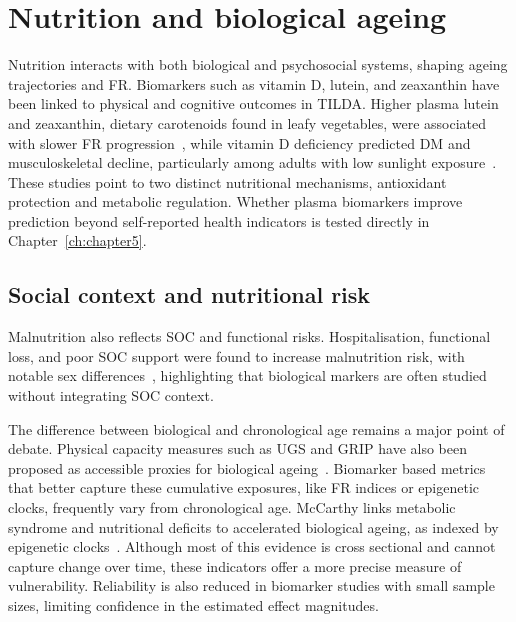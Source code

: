 \section{Nutrition and biological ageing}
Nutrition interacts with both biological and psychosocial systems, shaping ageing trajectories and \gls{FR}. 
Biomarkers such as vitamin D, lutein, and zeaxanthin have been linked to physical and cognitive outcomes in \gls{TILDA}. Higher plasma lutein and zeaxanthin, dietary carotenoids found in leafy vegetables, were associated with slower \gls{FR} progression~\cite{murphyPlasmaLuteinZeaxanthin2023}, while vitamin D deficiency predicted \gls{DM} and musculoskeletal decline, particularly among adults with low sunlight exposure~\cite{mccarthyAssociationVitaminDeficiency2022}.
These studies point to two distinct nutritional mechanisms, antioxidant protection and metabolic regulation. Whether plasma biomarkers improve prediction beyond self-reported health indicators is tested directly in Chapter~\ref{ch:chapter5}.

\subsection{Social context and nutritional risk}
Malnutrition also reflects \gls{SOC} and functional risks. Hospitalisation, functional loss, and poor \gls{SOC} support were found to increase malnutrition risk, with notable sex differences~\cite{bardonPredictorsIncidentMalnutrition2020}, highlighting that biological markers are often studied without integrating \gls{SOC} context.

The difference between biological and chronological age remains a major point of debate. Physical capacity measures such as \gls{UGS} and \gls{GRIP} have also been proposed as accessible proxies for biological ageing~\cite{tzemah-shaharWhatCanWe2022}.
Biomarker based metrics that better capture these cumulative exposures, like \gls{FR} indices or epigenetic clocks, frequently vary from chronological age. 
McCarthy links metabolic syndrome and nutritional deficits to accelerated biological ageing, as indexed by epigenetic clocks~\cite{mccarthyMetabolicSyndromeAccelerates2023}. 
Although most of this evidence is cross sectional and cannot capture change over time, these indicators offer a more precise measure of vulnerability. 
Reliability is also reduced in biomarker studies with small sample sizes, limiting confidence in the estimated effect magnitudes.

